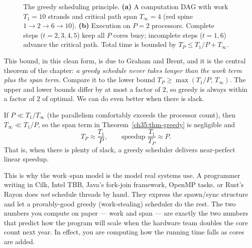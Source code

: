 \begin{figure}[h]
\caption{The greedy scheduling principle. \textbf{(a)} A computation DAG with
work $T_1 = 10$ strands and critical path span $T_\infty = 4$ (red spine
$1 \to 2 \to 6 \to 10$). \textbf{(b)} Execution on $P=2$ processors. Complete
steps ($t=2,3,4,5$) keep all $P$ cores busy; incomplete steps ($t=1,6$) advance
the critical path. Total time is bounded by $T_P \le T_1/P + T_\infty$.}
\label{ch35:fig-greedy-schedule}
\end{figure}

This bound, in this clean form, is due to Graham and Brent, and it is the
central theorem of the chapter: \emph{a greedy schedule never takes longer than the
work term plus the span term.} Compare it to the lower bound
$T_P \ge \max(T_1/P,\, T_\infty)$. The upper and lower bounds differ by at most a
factor of $2$, so greedy is always within a factor of $2$ of optimal. We can do
even better when there is slack.

\begin{corollary}\label{ch35:cor-slack}
If $P \ll T_1/T_\infty$ (the parallelism comfortably exceeds the processor count),
then $T_\infty \ll T_1/P$, so the span term in
Theorem~\ref{ch35:thm-greedy} is negligible and
\[
T_P \approx \frac{T_1}{P}, \qquad \text{speedup } \frac{T_1}{T_P} \approx P.
\]
That is, when there is plenty of slack, a greedy scheduler delivers near-perfect
linear speedup.
\end{corollary}

\begin{aestheticbox}
This is why the work--span model is the model real systems use. A programmer
writing in Cilk, Intel TBB, Java's fork-join framework, OpenMP tasks, or Rust's
Rayon does \emph{not} schedule threads by hand. They express the spawn/sync
structure and let a provably-good greedy (work-stealing) scheduler do the rest.
The two numbers you compute on paper --- work and span --- are exactly the two
numbers that predict how the program will scale when the hardware team doubles the
core count next year. In effect, you are computing how the running time falls
as cores are added.
\end{aestheticbox}

